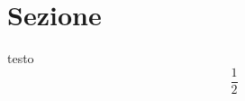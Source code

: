 \documentclass[11pt]{article}
\begin{document}
    \section{Sezione}
    testo
    \[\frac{1}{2}\]
\end{document}
